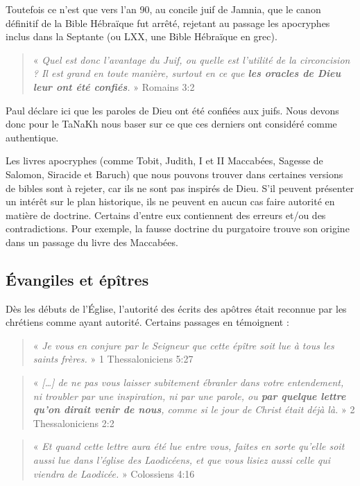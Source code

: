 \begin{small}
Toutefois ce n'est que vers l'an 90, au concile juif de Jamnia, que le canon définitif de la Bible Hébraïque fut arrêté, rejetant au passage les apocryphes inclus dans la Septante (ou LXX, une Bible Hébraïque en grec).

\begin{quote}
« \emph{Quel est donc l'avantage du Juif, ou quelle est l'utilité de la circoncision ? Il est grand en toute manière, surtout en ce que \textbf{les oracles de Dieu leur ont été confiés}.} » Romains 3:2
\end{quote}

Paul déclare ici que les paroles de Dieu ont été confiées aux juifs. Nous devons donc pour le TaNaKh nous baser sur ce que ces derniers ont considéré comme authentique.\bigskip

Les livres apocryphes (comme Tobit, Judith, I et II Maccabées, Sagesse de Salomon, Siracide et Baruch) que nous pouvons trouver dans certaines versions de bibles sont à rejeter, car ils ne sont pas inspirés de Dieu. S'il peuvent présenter un intérêt sur le plan historique, ils ne peuvent en aucun cas faire autorité en matière de doctrine. Certains d'entre eux contiennent des erreurs et/ou des contradictions. Pour exemple, la fausse doctrine du purgatoire trouve son origine dans un passage du livre des Maccabées.

\subsection*{Évangiles et épîtres}

Dès les débuts de l'Église, l'autorité des écrits des apôtres était reconnue par les chrétiens comme ayant autorité. Certains passages en témoignent :

\begin{quote}
« \emph{Je vous en conjure par le Seigneur que cette épître soit lue à tous les saints frères.} » 1 Thessaloniciens 5:27
\end{quote}

\begin{quote}
« \emph{[…] de ne pas vous laisser subitement ébranler dans votre entendement, ni troubler par une inspiration, ni par une parole, ou \textbf{par quelque lettre qu'on dirait venir de nous}, comme si le jour de Christ était déjà là.} » 2 Thessaloniciens 2:2
\end{quote}

\begin{quote}
« \emph{Et quand cette lettre aura été lue entre vous, faites en sorte qu'elle soit aussi lue dans l'église des Laodicéens, et que vous lisiez aussi celle qui viendra de Laodicée.} » Colossiens 4:16
\end{quote}


\end{small}
